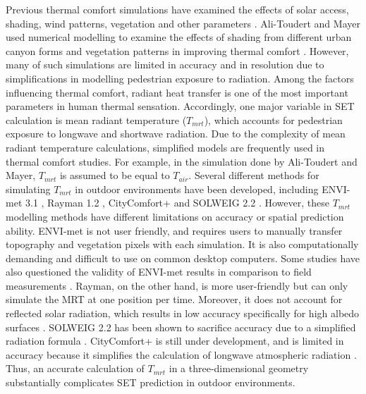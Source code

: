 \documentclass[preprint,3p,12pt,english]{elsarticle}
\begin{document}
Previous thermal comfort simulations have examined the effects of solar access, shading, wind patterns, vegetation and other parameters \cite{andreou_thermal_2013, acero_comparison_2015}. Ali-Toudert and Mayer used numerical modelling to examine the effects of shading from different urban canyon forms and vegetation patterns in improving thermal comfort \cite{ali2006effects,ali-toudert_effects_2007}. However, many of such simulations are limited in accuracy and in resolution due to simplifications in modelling pedestrian exposure to radiation. Among the factors influencing thermal comfort, radiant heat transfer is one of the most important parameters in human thermal sensation. Accordingly, one major variable in SET calculation is mean radiant temperature ($T_{mrt}$), which accounts for pedestrian exposure to longwave and shortwave radiation. Due to the complexity of mean radiant temperature calculations, simplified models are frequently used in thermal comfort studies. For example, in the simulation done by Ali-Toudert and Mayer, $T_{mrt}$ is assumed to be equal to $T_{air}$. Several different methods for simulating $T_{mrt}$ in outdoor environments have been developed, including ENVI-met 3.1 \cite{bruse2004envi}, Rayman 1.2 \cite{matzarakis2007modelling}, CityComfort+ \cite{huang2014citycomfort+} and SOLWEIG 2.2 \cite{lindberg2008solweig}. However, these $T_{mrt}$ modelling methods have different limitations on accuracy or spatial prediction ability. ENVI-met is not user friendly, and requires users to manually transfer topography and vegetation pixels with each simulation. It is also computationally demanding and difficult to use on common desktop computers. Some studies have also questioned the validity of ENVI-met results in comparison to field measurements \cite{toudertdependence}. Rayman, on the other hand, is more user-friendly but can only simulate the MRT at one position per time. Moreover, it does not account for reflected solar radiation, which results in low accuracy specifically for high albedo surfaces \cite{thorsson2007different}. SOLWEIG 2.2 has been shown to sacrifice accuracy due to a simplified radiation formula \cite{lindberg2008solweig}. CityComfort+ is still under development, and is limited in accuracy because it simplifies the calculation of longwave atmospheric radiation \cite{huang2014citycomfort+}.  Thus, an accurate calculation of $T_{mrt}$ in a three-dimensional geometry substantially complicates SET prediction in outdoor environments.
\end{document}
